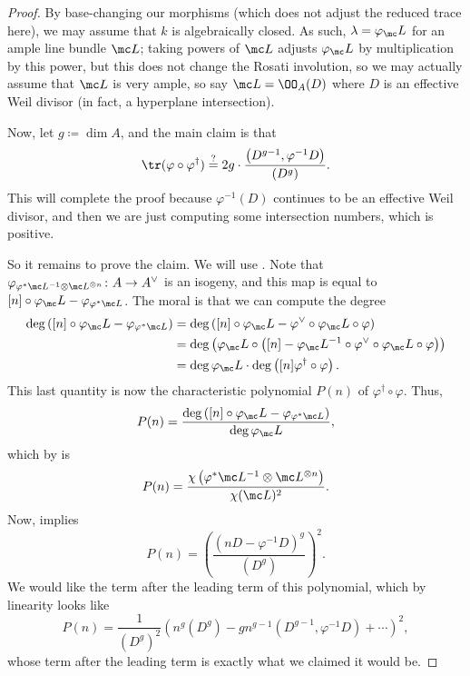 \documentclass[../notes.tex]{subfiles}
\begin{document}
\begin{proof}
	By base-changing our morphisms (which does not adjust the reduced trace here), we may assume that $k$ is algebraically closed. As such, $\lambda=\varphi_\mc L$ for an ample line bundle $\mc L$; taking powers of $\mc L$ adjusts $\varphi_\mc L$ by multiplication by this power, but this does not change the Rosati involution, so we may actually assume that $\mc L$ is very ample, so say $\mc L=\OO_A(D)$ where $D$ is an effective Weil divisor (in fact, a hyperplane intersection).

	Now, let $g\coloneqq\dim A$, and the main claim is that
	\[\tr(\varphi\circ\varphi^\dagger)\stackrel?=2g\cdot\frac{\left(D^{g-1},\varphi^{-1}D\right)}{\left(D^g\right)}.\]
	This will complete the proof because $\varphi^{-1}(D)$ continues to be an effective Weil divisor, and then we are just computing some intersection numbers, which is positive.

	So it remains to prove the claim. We will use . Note that $\varphi_{\varphi^*\mc L^{-1}\otimes\mc L^{\otimes n}}\colon A\to A^\lor$ is an isogeny, and this map is equal to $[n]\circ\varphi_\mc L-\varphi_{\varphi^*\mc L}$. The moral is that we can compute the degree
	\begin{align*}
		\deg\left([n]\circ\varphi_\mc L-\varphi_{\varphi^*\mc L}\right) &= \deg\left([n]\circ\varphi_\mc L-\varphi^\lor\circ\varphi_\mc L\circ\varphi\right) \\
		&= \deg\left(\varphi_\mc L\circ\left([n]-\varphi_\mc L^{-1}\circ\varphi^\lor\circ\varphi_\mc L\circ\varphi\right)\right) \\
		&= \deg\varphi_\mc L\cdot\deg\left([n]\varphi^\dagger\circ\varphi\right).
	\end{align*}
	This last quantity is now the characteristic polynomial $P(n)$ of $\varphi^\dagger\circ\varphi$. Thus,
	\[P(n)=\frac{\deg\left([n]\circ\varphi_\mc L-\varphi_{\varphi^*\mc L}\right)}{\deg\varphi_\mc L},\]
	which by  is
	\[P(n)=\frac{\chi\left(\varphi^*\mc L^{-1}\otimes\mc L^{\otimes n}\right)}{\chi(\mc L)^2}.\]
	Now,  implies
	\[P(n)=\left(\frac{(nD-\varphi^{-1}D)^g}{(D^g)}\right)^2.\]
	We would like the term after the leading term of this polynomial, which by linearity looks like
	\[P(n)=\frac1{(D^g)^2}\left(n^g(D^g)-gn^{g-1}\left(D^{g-1},\varphi^{-1}D\right)+\cdots\right)^2,\]
	whose term after the leading term is exactly what we claimed it would be.
\end{proof}
\end{document}
